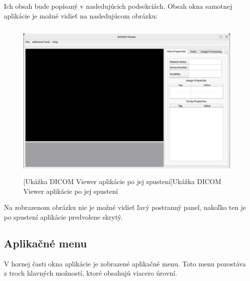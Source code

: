 {Ich obsah bude popísaný v nasledujúcich podsekciách.
Obsah okna samotnej aplikácie je možné vidieť na nasledujúcom obrázku:
\begin {figure}[ht]
        \centering
        \includegraphics[height=8cm]{media/existing_app/init.png}
        \captionsetup{justification=centering}
        [Ukážka DICOM Viewer aplikácie po jej spustení]{Ukážka DICOM Viewer aplikácie po jej spustení}
\end {figure}

Na zobrazenom obrázku nie je možné vidieť ľavý postranný panel, nakoľko ten je po spustení aplikácie predvolene skrytý.\clearpage

\subsection {Aplikačné menu}
V hornej časti okna aplikácie je zobrazené aplikačné menu. Toto menu pozostáva z troch hlavných možností, ktoré obsahujú viacero úrovní.

}
